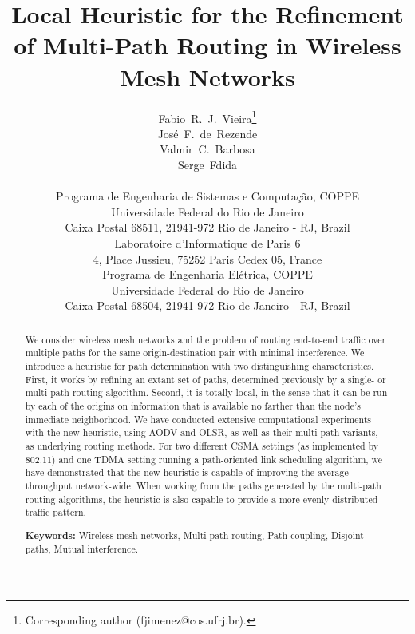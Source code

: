 \documentclass{article}
\begin{document}
\title{Local Heuristic for the Refinement of Multi-Path Routing in Wireless Mesh
Networks}

\author{Fabio~R.~J.~Vieira\thanks{Corresponding author (fjimenez@cos.ufrj.br).}\\
Jos\'e~F.~de~Rezende\\
Valmir~C.~Barbosa\\
Serge~Fdida\\
\\
Programa de Engenharia de Sistemas e Computa\c c\~ao, COPPE\\
Universidade Federal do Rio de Janeiro\\
Caixa Postal 68511, 21941-972 Rio de Janeiro - RJ, Brazil\\
Laboratoire d'Informatique de Paris 6\\
4, Place Jussieu, 75252 Paris Cedex 05, France\\
Programa de Engenharia El\'etrica, COPPE\\
Universidade Federal do Rio de Janeiro\\
Caixa Postal 68504, 21941-972 Rio de Janeiro - RJ, Brazil}

\date{}

\maketitle

\begin{abstract}
We consider wireless mesh networks and the problem of routing end-to-end traffic
over multiple paths for the same origin-destination pair with minimal
interference. We introduce a heuristic for path determination with two
distinguishing characteristics. First, it works by refining an extant set of
paths, determined previously by a single- or multi-path routing algorithm.
Second, it is totally local, in the sense that it can be run by each of the
origins on information that is available no farther than the node's immediate
neighborhood. We have conducted extensive computational experiments with the new
heuristic, using AODV and OLSR, as well as their multi-path variants, as
underlying routing methods. For two different CSMA settings (as implemented by
802.11) and one TDMA setting running a path-oriented link scheduling algorithm,
we have demonstrated that the new heuristic is capable of improving the average
throughput network-wide. When working from the paths generated by the multi-path
routing algorithms, the heuristic is also capable to provide a more evenly
distributed traffic pattern.

\bigskip
\noindent
\textbf{Keywords:} Wireless mesh networks, Multi-path routing, Path coupling,
Disjoint paths, Mutual interference.
\end{abstract}
\end{document}
